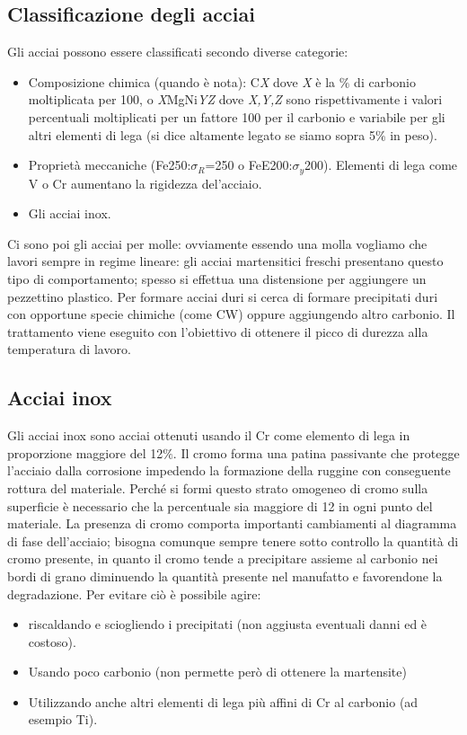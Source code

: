 \subsection{Classificazione degli acciai}

Gli acciai possono essere classificati secondo diverse categorie:
\begin{itemize}
    \item Composizione chimica (quando è nota): C\textit{X} dove \textit{X} è la $\%$ di carbonio moltiplicata per 100, o \textit{X}MgNi\textit{YZ} dove \textit{X,Y,Z} sono rispettivamente i valori percentuali moltiplicati per un fattore 100 per il carbonio e variabile per gli altri elementi di lega (si dice altamente legato se siamo sopra 5$\%$ in peso).
    \item Proprietà meccaniche (Fe250:$\sigma_R$=250 o FeE200:$\sigma_y$200). Elementi di lega come V o Cr aumentano la rigidezza del'acciaio.
    \item Gli acciai inox.
\end{itemize}

Ci sono poi gli acciai per molle: ovviamente essendo una molla vogliamo che lavori sempre in regime lineare: gli acciai martensitici freschi presentano questo tipo di comportamento; spesso si effettua una distensione per aggiungere un pezzettino plastico.
Per formare acciai duri si cerca di formare precipitati duri con opportune specie chimiche (come CW) oppure aggiungendo altro carbonio. Il trattamento viene eseguito con l'obiettivo di ottenere il picco di durezza alla temperatura di lavoro.

\subsection{Acciai inox}

Gli acciai inox sono acciai ottenuti usando il Cr come elemento di lega in proporzione maggiore del 12$\%$. Il cromo forma una patina passivante che protegge l'acciaio dalla corrosione impedendo la formazione della ruggine con conseguente rottura del materiale. Perché si formi questo strato omogeneo di cromo sulla superficie è necessario che la percentuale sia maggiore di 12 in ogni punto del materiale. La presenza di cromo comporta importanti cambiamenti al diagramma di fase dell'acciaio; bisogna comunque sempre tenere sotto controllo la quantità di cromo presente, in quanto il cromo tende a precipitare assieme al carbonio nei bordi di grano diminuendo la quantità presente nel manufatto e favorendone la degradazione.
Per evitare ciò è possibile agire:
\begin{itemize}
    \item riscaldando e sciogliendo i precipitati (non aggiusta eventuali danni ed è costoso).
    \item Usando poco carbonio (non permette però di ottenere la martensite)
    \item Utilizzando anche altri elementi di lega più affini di Cr al carbonio (ad esempio Ti).
\end{itemize}


